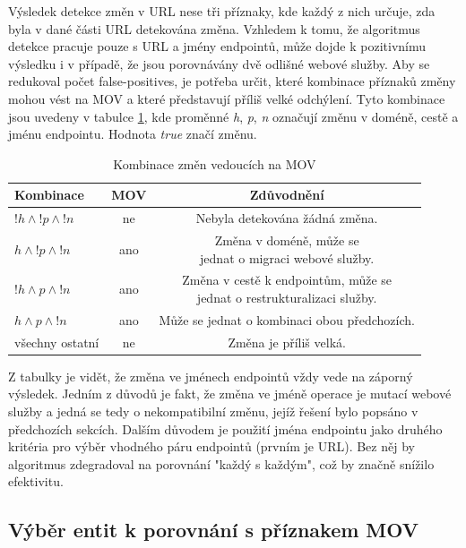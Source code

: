 \documentclass[czech,DP]{thesiskiv}
\begin{document}
Výsledek detekce změn v URL nese tři příznaky, kde každý z nich určuje, zda byla v dané části URL detekována změna. Vzhledem k tomu, že algoritmus detekce pracuje pouze s URL a jmény endpointů, může dojde k pozitivnímu výsledku i v případě, že jsou porovnávány dvě odlišné webové služby. Aby se redukoval počet false-positives, je potřeba určit, které kombinace příznaků změny mohou vést na MOV a které představují příliš velké odchýlení. Tyto kombinace jsou uvedeny v tabulce \ref{tab:mov-explanation}, kde proměnné \textit{h}, \textit{p}, \textit{n} označují změnu v doméně, cestě a jménu endpointu. Hodnota \textit{true} značí změnu.

\begin{table}[h]
	\begin{tabular}{|l|c|c|}
		\hline
		Kombinace & MOV & Zdůvodnění \\
		\hline
		\hline
		$!h \land !p \land !n$ & ne & Nebyla detekována žádná změna. \\
		\hline
		$h \land !p \land !n$ & ano & \makecell{Změna v doméně, může se \\jednat o migraci webové služby.} \\
		\hline
		$!h \land p \land !n$ & ano & \makecell{Změna v cestě k endpointům, může se \\ jednat o restrukturalizaci služby.} \\
		\hline
		$h \land p \land !n$ & ano & Může se jednat o kombinaci obou předchozích. \\
		\hline
		všechny ostatní & ne & Změna je příliš velká. \\
		\hline
	\end{tabular}
	\caption{Kombinace změn vedoucích na MOV}
	\label{tab:mov-explanation}
\end{table}

Z tabulky je vidět, že změna ve jménech endpointů vždy vede na záporný výsledek. Jedním z důvodů je fakt, že změna ve jméně operace je mutací webové služby a jedná se tedy o nekompatibilní změnu, jejíž řešení bylo popsáno v předchozích sekcích. Dalším důvodem je použití jména endpointu jako druhého kritéria pro výběr vhodného páru endpointů (prvním je URL). Bez něj by algoritmus zdegradoval na porovnání "každý s každým",  což by značně snížilo efektivitu.   

\subsection{Výběr entit k porovnání s příznakem MOV}
\end{document}
